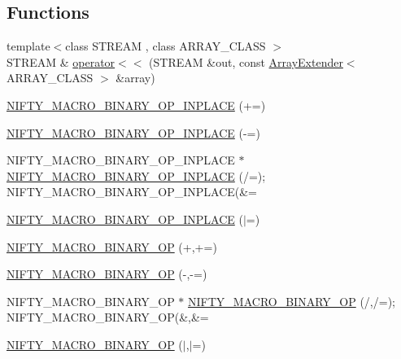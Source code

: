 \subsection*{Functions}
\begin{DoxyCompactItemize}
\item 
{\footnotesize template$<$class S\+T\+R\+E\+A\+M , class A\+R\+R\+A\+Y\+\_\+\+C\+L\+A\+S\+S $>$ }\\S\+T\+R\+E\+A\+M \& \hyperlink{namespacenifty_1_1array_ae3d01c9b4b4259a31ac35ce0a6cf3b48}{operator$<$$<$} (S\+T\+R\+E\+A\+M \&out, const \hyperlink{classnifty_1_1array_1_1ArrayExtender}{Array\+Extender}$<$ A\+R\+R\+A\+Y\+\_\+\+C\+L\+A\+S\+S $>$ \&array)
\item 
\hyperlink{namespacenifty_1_1array_a9cfe55e7ae08c0c0a43a6f27d18929d4}{N\+I\+F\+T\+Y\+\_\+\+M\+A\+C\+R\+O\+\_\+\+B\+I\+N\+A\+R\+Y\+\_\+\+O\+P\+\_\+\+I\+N\+P\+L\+A\+C\+E} (+=)
\item 
\hyperlink{namespacenifty_1_1array_a9f4f64ff2f9c1ab8afe746625ce8fbc9}{N\+I\+F\+T\+Y\+\_\+\+M\+A\+C\+R\+O\+\_\+\+B\+I\+N\+A\+R\+Y\+\_\+\+O\+P\+\_\+\+I\+N\+P\+L\+A\+C\+E} (-\/=)
\item 
N\+I\+F\+T\+Y\+\_\+\+M\+A\+C\+R\+O\+\_\+\+B\+I\+N\+A\+R\+Y\+\_\+\+O\+P\+\_\+\+I\+N\+P\+L\+A\+C\+E $\ast$ \hyperlink{namespacenifty_1_1array_a4786c4b393cff5d99d56b55ec1aabe5b}{N\+I\+F\+T\+Y\+\_\+\+M\+A\+C\+R\+O\+\_\+\+B\+I\+N\+A\+R\+Y\+\_\+\+O\+P\+\_\+\+I\+N\+P\+L\+A\+C\+E} (/=);       N\+I\+F\+T\+Y\+\_\+\+M\+A\+C\+R\+O\+\_\+\+B\+I\+N\+A\+R\+Y\+\_\+\+O\+P\+\_\+\+I\+N\+P\+L\+A\+C\+E(\&=
\item 
\hyperlink{namespacenifty_1_1array_a7b3793e9633aafbb149e77b4292d0a74}{N\+I\+F\+T\+Y\+\_\+\+M\+A\+C\+R\+O\+\_\+\+B\+I\+N\+A\+R\+Y\+\_\+\+O\+P\+\_\+\+I\+N\+P\+L\+A\+C\+E} ($\vert$=)
\item 
\hyperlink{namespacenifty_1_1array_adacdae329fa7ea377154bbc41717f86f}{N\+I\+F\+T\+Y\+\_\+\+M\+A\+C\+R\+O\+\_\+\+B\+I\+N\+A\+R\+Y\+\_\+\+O\+P} (+,+=)
\item 
\hyperlink{namespacenifty_1_1array_a7960bc347c963a7cde9178e3e66d8903}{N\+I\+F\+T\+Y\+\_\+\+M\+A\+C\+R\+O\+\_\+\+B\+I\+N\+A\+R\+Y\+\_\+\+O\+P} (-\/,-\/=)
\item 
N\+I\+F\+T\+Y\+\_\+\+M\+A\+C\+R\+O\+\_\+\+B\+I\+N\+A\+R\+Y\+\_\+\+O\+P $\ast$ \hyperlink{namespacenifty_1_1array_a7777b1eeea0908a2cf0259b2d79db7fb}{N\+I\+F\+T\+Y\+\_\+\+M\+A\+C\+R\+O\+\_\+\+B\+I\+N\+A\+R\+Y\+\_\+\+O\+P} (/,/=);       N\+I\+F\+T\+Y\+\_\+\+M\+A\+C\+R\+O\+\_\+\+B\+I\+N\+A\+R\+Y\+\_\+\+O\+P(\&,\&=
\item 
\hyperlink{namespacenifty_1_1array_adbe1f99691b0c07ecfb3d57a3ad3f194}{N\+I\+F\+T\+Y\+\_\+\+M\+A\+C\+R\+O\+\_\+\+B\+I\+N\+A\+R\+Y\+\_\+\+O\+P} ($\vert$,$\vert$=)
\end{DoxyCompactItemize}


